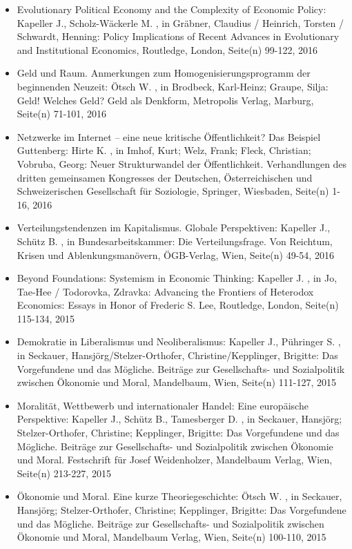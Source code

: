 \begin{itemize}
\item Evolutionary Political Economy and the Complexity of Economic Policy: Kapeller J., Scholz-Wäckerle M. , in Gräbner,  Claudius / Heinrich, Torsten / Schwardt, Henning: Policy  Implications of Recent Advances in Evolutionary and Institutional  Economics, Routledge, London, Seite(n) 99-122, 2016
\item Geld und Raum. Anmerkungen zum Homogenisierungsprogramm der beginnenden Neuzeit: Ötsch W. , in Brodbeck, Karl-Heinz; Graupe, Silja: Geld! Welches Geld? Geld als Denkform, Metropolis Verlag, Marburg, Seite(n) 71-101, 2016
\item Netzwerke im Internet – eine neue kritische Öffentlichkeit? Das Beispiel Guttenberg: Hirte K. , in Imhof, Kurt; Welz, Frank; Fleck, Christian; Vobruba, Georg: Neuer Strukturwandel der Öffentlichkeit. Verhandlungen des dritten gemeinsamen Kongresses der Deutschen, Österreichischen und Schweizerischen Gesellschaft für Soziologie, Springer, Wiesbaden, Seite(n) 1-16, 2016
\item Verteilungstendenzen im Kapitalismus. Globale Perspektiven: Kapeller J., Schütz B. , in Bundesarbeitskammer: Die Verteilungsfrage. Von Reichtum, Krisen und Ablenkungsmanövern, ÖGB-Verlag, Wien, Seite(n) 49-54, 2016
\item Beyond Foundations: Systemism in Economic  Thinking: Kapeller J. , in Jo, Tae-Hee / Todorovka, Zdravka: Advancing the Frontiers of Heterodox Economics: Essays in Honor of Frederic S. Lee, Routledge, London, Seite(n) 115-134, 2015
\item Demokratie in Liberalismus und Neoliberalismus: Kapeller J., Pühringer S. , in Seckauer, Hansjörg/Stelzer-Orthofer, Christine/Kepplinger, Brigitte: Das Vorgefundene und das Mögliche. Beiträge zur Gesellschafts- und Sozialpolitik zwischen Ökonomie und Moral, Mandelbaum, Wien, Seite(n) 111-127, 2015
\item Moralität, Wettbewerb und internationaler Handel: Eine europäische Perspektive: Kapeller J., Schütz B., Tamesberger D. , in Seckauer, Hansjörg; Stelzer-Orthofer, Christine; Kepplinger, Brigitte: Das Vorgefundene und das Mögliche. Beiträge zur Gesellschafts- und Sozialpolitik zwischen Ökonomie und Moral. Festschrift für Josef Weidenholzer, Mandelbaum Verlag, Wien, Seite(n) 213-227, 2015
\item Ökonomie und Moral. Eine kurze Theoriegeschichte: Ötsch W. , in Seckauer, Hansjörg; Stelzer-Orthofer, Christine; Kepplinger, Brigitte: Das Vorgefundene und das Mögliche. Beiträge zur Gesellschafts- und Sozialpolitik zwischen Ökonomie und Moral, Mandelbaum Verlag, Wien, Seite(n) 100-110, 2015

\end{itemize}
